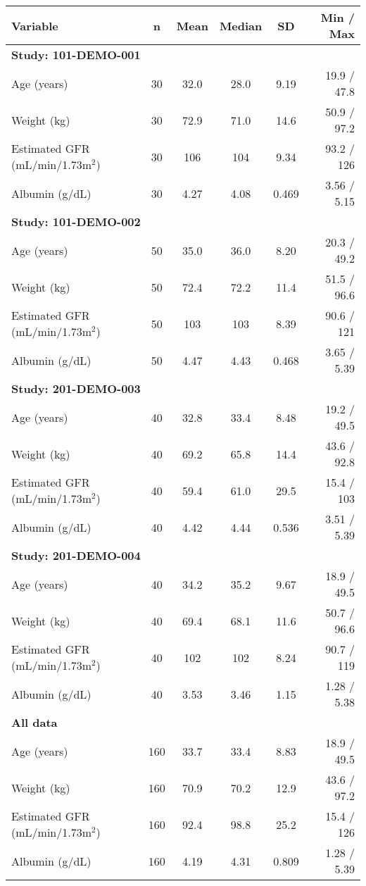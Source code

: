 \setlength{\tabcolsep}{5pt} 
\begin{threeparttable}
\renewcommand{\arraystretch}{1.3}
\begin{tabular}[h]{lccccr}
\hline
Variable & n & Mean & Median & SD & Min / Max \\
\hline
\multicolumn{6}{l}{\textbf{Study: 101-DEMO-001}}\\%
Age (years) & 30 & 32.0 & 28.0 & 9.19 & 19.9 / 47.8 \\
Weight (kg) & 30 & 72.9 & 71.0 & 14.6 & 50.9 / 97.2 \\
Estimated GFR (mL/min/1.73m$^2$) & 30 & 106 & 104 & 9.34 & 93.2 / 126 \\
Albumin (g/dL) & 30 & 4.27 & 4.08 & 0.469 & 3.56 / 5.15 \\
\hline \multicolumn{6}{l}{\textbf{Study: 101-DEMO-002}}\\%
Age (years) & 50 & 35.0 & 36.0 & 8.20 & 20.3 / 49.2 \\
Weight (kg) & 50 & 72.4 & 72.2 & 11.4 & 51.5 / 96.6 \\
Estimated GFR (mL/min/1.73m$^2$) & 50 & 103 & 103 & 8.39 & 90.6 / 121 \\
Albumin (g/dL) & 50 & 4.47 & 4.43 & 0.468 & 3.65 / 5.39 \\
\hline \multicolumn{6}{l}{\textbf{Study: 201-DEMO-003}}\\%
Age (years) & 40 & 32.8 & 33.4 & 8.48 & 19.2 / 49.5 \\
Weight (kg) & 40 & 69.2 & 65.8 & 14.4 & 43.6 / 92.8 \\
Estimated GFR (mL/min/1.73m$^2$) & 40 & 59.4 & 61.0 & 29.5 & 15.4 / 103 \\
Albumin (g/dL) & 40 & 4.42 & 4.44 & 0.536 & 3.51 / 5.39 \\
\hline \multicolumn{6}{l}{\textbf{Study: 201-DEMO-004}}\\%
Age (years) & 40 & 34.2 & 35.2 & 9.67 & 18.9 / 49.5 \\
Weight (kg) & 40 & 69.4 & 68.1 & 11.6 & 50.7 / 96.6 \\
Estimated GFR (mL/min/1.73m$^2$) & 40 & 102 & 102 & 8.24 & 90.7 / 119 \\
Albumin (g/dL) & 40 & 3.53 & 3.46 & 1.15 & 1.28 / 5.38 \\
\hline \multicolumn{6}{l}{\textbf{All data}}\\%
Age (years) & 160 & 33.7 & 33.4 & 8.83 & 18.9 / 49.5 \\
Weight (kg) & 160 & 70.9 & 70.2 & 12.9 & 43.6 / 97.2 \\
Estimated GFR (mL/min/1.73m$^2$) & 160 & 92.4 & 98.8 & 25.2 & 15.4 / 126 \\
Albumin (g/dL) & 160 & 4.19 & 4.31 & 0.809 & 1.28 / 5.39 \\
\hline
\end{tabular}
\end{threeparttable}

